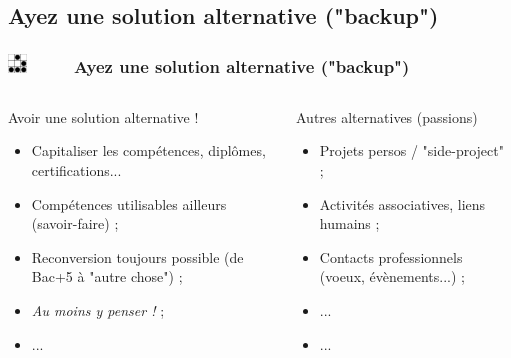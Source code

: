 \documentclass[slidetop,11pt]{beamer}
\def\sectionPartVd{Ayez une solution alternative ("backup")}
\def\moreInFrameTitle{\includegraphics[height=0.5cm]{img/logo_glider.png}~~~~~}
\begin{document}
\subsection{\sectionPartVd}
\begin{frame}
	\frametitle{\moreInFrameTitle \sectionPartVd}
	\begin{columns}[T]
	\begin{column}[T]{5.50cm}
		\begin{beamerboxesrounded}	[lower=substructureTR, %
		 				 upper=block title TR,%
						 shadow=true]%
		       {Avoir une solution alternative !}
			\begin{itemize}
				\item Capitaliser les comp{\'e}tences, dipl{\^o}mes, certifications...
				\item Comp{\'e}tences utilisables ailleurs (savoir-faire) ; 
				\item Reconversion toujours possible (de Bac+5 {\`a} "autre chose") ; 
				\item \emph{Au moins y penser !} ; 
				\item ... 
			\end{itemize}
		\end{beamerboxesrounded}
	\end{column}
	\begin{column}[T]{5.50cm}
		\begin{beamerboxesrounded}	[lower=substructureUN, %
		 				 upper=block title UN,%
						 shadow=true]%
		       {Autres alternatives (passions)}
			\begin{itemize}
				\item Projets persos / "side-project" ; 
				\item Activit{\'e}s associatives, liens humains ; 
				\item Contacts professionnels (voeux, {\'e}v{\`e}nements...) ; 
				\item ... 
				\item ... 
			\end{itemize}
		\end{beamerboxesrounded}
	\end{column}
	\end{columns}
\end{frame}
\end{document}
